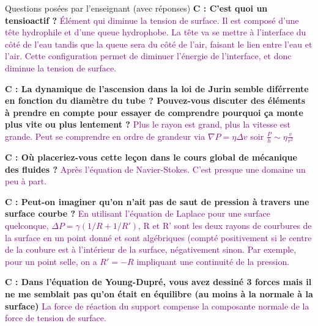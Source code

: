 \begin{reportBlock}{Questions posées par l’enseignant (avec réponses)}
  \textbf{C : C'est quoi un tensioactif ?} \textcolor{purple}{\'{E}lément qui diminue la tension de surface. Il est composé d'une tête hydrophile et d'une queue hydrophobe. La tête va se mettre à l'interface du côté de l'eau tandis que la queue sera du côté de l'air, faisant le lien entre l'eau et l'air. Cette configuration permet de diminuer l'énergie de l'interface, et donc diminue la tension de surface. } \newline

  \textbf{C : La dynamique de l'ascension dans la loi de Jurin semble diférrente en fonction du diamètre du tube ? Pouvez-vous discuter des éléments à prendre en compte pour essayer de comprendre pourquoi ça monte plus vite ou plus lentement ?} \textcolor{purple}{Plus le rayon est grand, plus la vitesse est grande. Peut se comprendre en ordre de grandeur via $\nabla P = \eta \Delta v$ soir $\frac{P}{h} \sim \eta \frac{v}{r^2}$}

  \textbf{C : Où placeriez-vous cette leçon dans le cours global de mécanique des fluides ?} \textcolor{purple}{Après l'équation de Navier-Stokes. C'est presque une domaine un peu à part.}

  \textbf{C : Peut-on imaginer qu'on n'ait pas de saut de pression à travers une surface courbe ?} \textcolor{purple}{En utilisant l'équation de Laplace pour une surface quelconque, $\Delta P =\gamma(1/R+1/R')$, R et R' sont les deux rayons de courbures de la surface en un point donné et sont algébriques (compté positivement si le centre de la coubure est à l'intérieur de la surface, négativement sinon. Par exemple, pour un point selle, on a $R' = -R$ impliquant une continuité de la pression.}

  \textbf{C : Dans l'équation de Young-Dupré, vous avez dessiné 3 forces mais il ne me semblait pas qu'on était en équilibre (au moins à la normale à la surface)} \textcolor{purple}{La force de réaction du support compense la composante normale de la force de tension de surface.}


\end{reportBlock}
